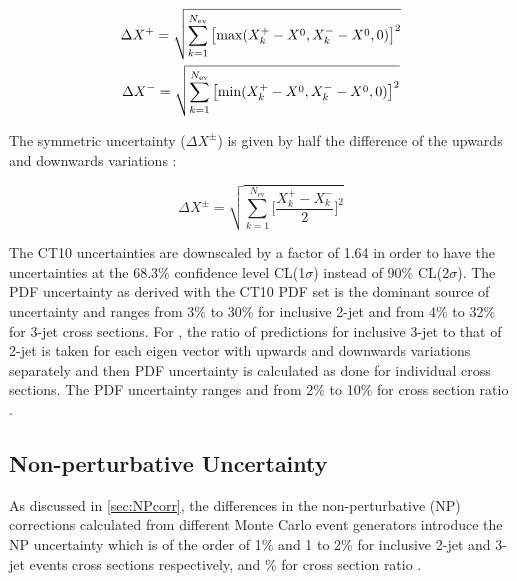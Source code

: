 \begin{equation}
\label{eq:unc_pdf}
\begin{gathered}
\Delta X^+ =  \sqrt{\sum \limits_{k=1}^{N_\mathrm{ev}}\big[{\rm max}(X^{+}_{k}-X^{0},X^{-}_{k}-X^{0},0)\big]^2} \\
\Delta X^- =  \sqrt{\sum \limits_{k=1}^{N_\mathrm{ev}}\big[{\rm min}(X^{+}_{k}-X^{0},X^{-}_{k}-X^{0},0)\big]^2}
\end{gathered}
\end{equation}

The symmetric uncertainty ($\Delta X^{\pm}$) is given by half the difference of the upwards and downwards variations :

\begin{equation}
\label{eq:unc_pdf_symm}
\Delta X^{\pm} = \sqrt{\sum \limits_{k=1}^{N_\mathrm{ev}} \Bigg[\frac{X^{+}_{k}-X^{-}_{k}}{2}\Bigg]^2}
\end{equation}

The CT10 uncertainties are downscaled by a factor of 1.64 in order to have the uncertainties at the 68.3\% confidence level CL(1$\sigma$) instead of 90\% CL(2$\sigma$). The PDF uncertainty as derived with the CT10 PDF set is the dominant source of uncertainty and ranges from 3\% to 30\% for inclusive 2-jet and from 4\% to 32\% for 3-jet cross sections. For \ratio, the ratio of predictions for inclusive 3-jet to that of 2-jet is taken for each eigen vector with upwards and downwards variations separately and then PDF uncertainty is calculated as done for individual cross sections. The PDF uncertainty ranges and from 2\% to 10\% for cross section ratio \ratio.

\subsection{Non-perturbative Uncertainty}
As discussed in \ref{sec:NPcorr}, the differences in the non-perturbative (NP) corrections calculated from different Monte Carlo event generators introduce the NP uncertainty which is of the order of 1\% and 1 to 2\% for inclusive 2-jet and 3-jet events cross sections respectively, and \% for cross section ratio \ratio.

